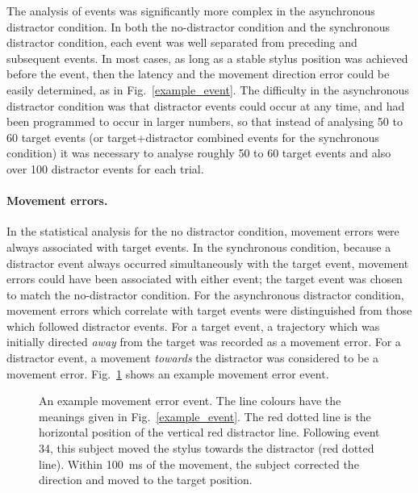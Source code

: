 \documentclass[10pt,letterpaper]{article}
\begin{document}
The analysis of events was significantly more complex in the
asynchronous distractor condition. In both the no-distractor condition
and the synchronous distractor condition, each event was well
separated from preceding and subsequent events. In most cases, as long
as a stable stylus position was achieved before the event, then the
latency and the movement direction error could be easily determined,
as in Fig.~\ref{example_event}. The difficulty in the asynchronous
distractor condition was that distractor events could occur at any
time, and had been programmed to occur in larger numbers, so that
instead of analysing 50 to 60 target events (or target+distractor
combined events for the synchronous condition) it was necessary to
analyse roughly 50 to 60 target events and also over 100 distractor
events for each trial.

\paragraph{Movement errors.} In the statistical analysis for the no
distractor condition, movement errors were always associated with
target events. In the synchronous condition, because a distractor
event always occurred simultaneously with the target event, movement
errors could have been associated with either event; the target event
was chosen to match the no-distractor condition. For the
asynchronous distractor condition, movement errors which correlate
with target events were distinguished from those which followed
distractor events. For a target event, a trajectory which was initially
directed \emph{away} from the target was recorded as a movement error. For a
distractor event, a movement \emph{towards} the distractor was considered to
be a movement error. Fig.~\ref{example_errorevent} shows an example movement
error event.

\begin{figure}[htb!]
\centering
\caption[Example error event] {An example movement error event. The
  line colours have the meanings given in
  Fig.~\ref{example_event}. The red dotted line is the horizontal
  position of the vertical red distractor line. Following event 34,
  this subject moved the stylus towards the distractor (red dotted
  line). Within 100~ms of the movement, the subject corrected the
  direction and moved to the target position.}
\label{example_errorevent}
\end{figure}
\end{document}
